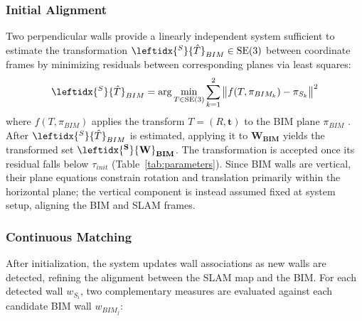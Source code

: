 \subsubsection*{\textbf{Initial Alignment}}
Two perpendicular walls provide a linearly independent system sufficient to estimate the transformation $\leftidx{^S}{\hat{T}}_{BIM} \in \mathrm{SE}(3)$ between coordinate frames by minimizing residuals between corresponding planes via least squares:
% 
\begin{equation}
\leftidx{^S}{\hat{T}}_{BIM} = \arg\min_{T \in \mathrm{SE}(3)} 
\sum_{k=1}^{2} \big\| f(T, \pi_{BIM_k}) - \pi_{S_k} \big\|^2
\end{equation}
% 
\noindent where $f(T,\pi_{BIM})$ applies the transform $T=(R,\mathbf{t})$ to the BIM plane $\pi_{BIM}$ . After $\leftidx{^S}{\hat{T}}_{BIM}$ is estimated, applying it to $\mathbf{W_{\text{BIM}}}$ yields the transformed set $\mathbf{\leftidx{^S}{{W}}_{BIM}}$.
The transformation is accepted once its residual falls below $\tau_{init}$ (Table~\ref{tab:parameters}). Since BIM walls are vertical, their plane equations constrain rotation and translation primarily within the horizontal plane; the vertical component is instead assumed fixed at system setup, aligning the BIM and SLAM frames.



\subsubsection*{\textbf{Continuous Matching}}
After initialization, the system updates wall associations as new walls are detected, refining the alignment between the SLAM map and the BIM. For each detected wall $w_{S_i}$, two complementary measures are evaluated against each candidate BIM wall $w_{BIM_j}$:


